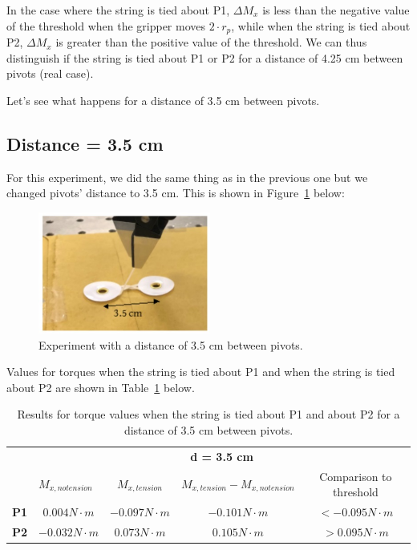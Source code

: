 In the case where the string is tied about P1, $\Delta M_{x}$ is less than the negative value of the threshold when the gripper moves $2 \cdot r_{p}$, while when the string is tied about P2, $\Delta M_{x}$ is greater than the positive value of the threshold. We can thus distinguish if the string is tied about P1 or P2 for a distance of 4.25 cm between pivots (real case).

Let's see what happens for a distance of 3.5 cm between pivots.

\subsection{Distance = 3.5 cm}
For this experiment, we did the same thing as in the previous one but we changed pivots' distance to 3.5 cm. This is shown in Figure~\ref{fig:distance2} below:
\begin{figure}[h!]
	\centering
	\includegraphics[height=40mm]{chapters/figures/experiments/exp3_distance2.jpg}
	\caption{Experiment with a distance of 3.5 cm between pivots.}
	\label{fig:distance2}
\end{figure}

Values for torques when the string is tied about P1 and when the string is tied about P2 are shown in Table~\ref{tab:distance2} below.
\begin{table}[htbp]
	\centering
	\begin{tabular}{|l|c|c|c|c|}
		\cmidrule{2-5}    \multicolumn{1}{r|}{} & \multicolumn{4}{c|}{\textbf{d = 3.5 cm}} \\
		\cmidrule{2-5}    \multicolumn{1}{r|}{} & \multicolumn{1}{l|}{\textbf{$M_{x, no tension}$}} & \textbf{$M_{x, tension}$} & \textbf{$M_{x, tension} - M_{x, no tension}$} & Comparison to threshold \\
		\midrule
		\textbf{P1} & $0.004 N \cdot m$ & $-0.097 N \cdot m$ & $-0.101 N \cdot m$ & $< -0.095 N \cdot m$ \\
		\midrule
		\textbf{P2} & $-0.032 N \cdot m$ & $0.073 N \cdot m$ & $0.105 N \cdot m$ & $> 0.095 N \cdot m$ \\
		\bottomrule
	\end{tabular}%
	\caption{Results for torque values when the string is tied about P1 and about P2 for a distance of 3.5 cm between pivots.}
	\label{tab:distance2}%
\end{table}%

